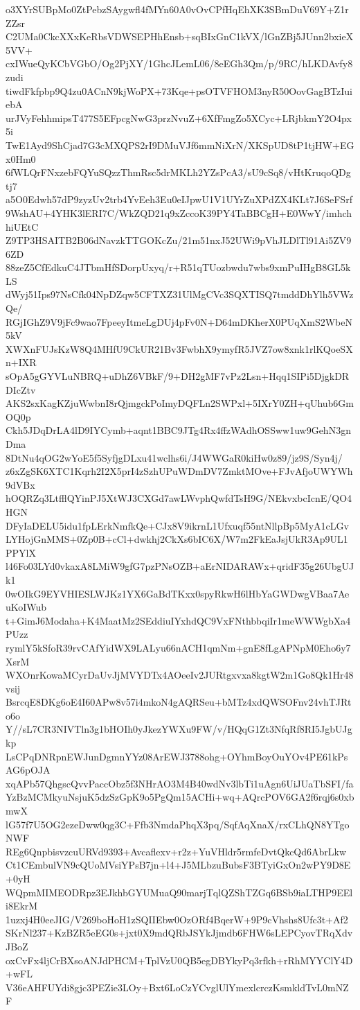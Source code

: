 o3XYrSUBpMo0ZtPebzSAygwfl4fMYn60A0vOvCPfHqEhXK3SBmDuV69Y+Z1rZZsr
C2UMa0CkcXXxKeRbsVDWSEPHhEnsb+sqBIxGnC1kVX/lGnZBj5JUnn2bxieX5VV+
cxIWueQyKCbVGbO/Og2PjXY/1GhcJLemL06/8eEGh3Qm/p/9RC/hLKDAvfy8zudi
tiwdFkfpbp9Q4zu0ACnN9kjWoPX+73Kqe+psOTVFHOM3nyR50OovGagBTzIuiebA
urJVyFehhmipsT477S5EFpcgNwG3przNvuZ+6XfFmgZo5XCyc+LRjbkmY2O4px5i
TwE1Ayd9ShCjad7G3cMXQPS2rI9DMuVJf6mmNiXrN/XKSpUD8tP1tjHW+EGx0Hm0
6fWLQrFNxzebFQYuSQzzThmRsc5drMKLh2YZsPcA3/sU9cSq8/vHtKruqoQDgtj7
a5O0Edwh57dP9zyzUv2trb4YvEeh3Eu0eIJpwU1V1UYrZuXPdZX4KLt7J6SeFSrf
9WshAU+4YHK3lERI7C/WkZQD21q9xZccoK39PY4TaBBCgH+E0WwY/imhchhiUEtC
Z9TP3HSAITB2B06dNavzkTTGOKcZu/21m51nxJ52UWi9pVhJLDlTl91Ai5ZV96ZD
88zeZ5CfEdkuC4JTbmHfSDorpUxyq/r+R51qTUozbwdu7wbs9xmPuIHgB8GL5kLS
dWyj51Ips97NsCfk04NpDZqw5CFTXZ31UlMgCVc3SQXTISQ7tmddDhYlh5VWzQe/
RGjIGhZ9V9jFc9wao7FpeeyItmeLgDUj4pFv0N+D64mDKherX0PUqXmS2WbeN5kV
XWXnFUJsKzW8Q4MHfU9CkUR21Bv3FwbhX9ymyfR5JVZ7ow8xnk1rlKQoeSXn+IXR
sOpA5gGYVLuNBRQ+uDhZ6VBkF/9+DH2gMF7vPz2Lsn+Hqq1SIPi5DjgkDRDIcZtv
AKS2sxKagKZjuWwbnI8rQjmgckPoImyDQFLn2SWPxl+5IXrY0ZH+qUhub6GmOQ0p
Ckh5JDqDrLA4lD9IYCymb+aqnt1BBC9JTg4Rx4ffzWAdhOSSww1uw9GehN3gnDma
8DtNu4qOG2wYoE5f5SyfjgDLxu41wclhs6i/J4WWGaR0kiHw0z89/jz9S/Syn4j/
z6xZgSK6XTC1Kqrh2I2X5prI4zSzhUPuWDmDV7ZmktMOve+FJvAfjoUWYWh9dVBx
hOQRZq3LtfflQYinPJ5XtWJ3CXGd7awLWvphQwfdTsH9G/NEkvxbcIcnE/QO4HGN
DFyIaDELU5idu1fpLErkNmfkQe+CJx8V9ikrnL1Ufxuqf55ntNllpBp5MyA1cLGv
LYHojGnMMS+0Zp0B+cCl+dwkhj2CkXs6bIC6X/W7m2FkEaJsjUkR3Ap9UL1PPYlX
l46Fo03LYd0vkaxA8LMiW9gfG7pzPNsOZB+aErNIDARAWx+qridF35g26UbgUJk1
0wOIkG9EYVHIESLWJKz1YX6GaBdTKxx0spyRkwH6lHbYaGWDwgVBaa7AeuKoIWub
t+GimJ6Modaha+K4MaatMz2SEddiuIYxhdQC9VxFNthbbqiIr1meWWWgbXa4PUzz
rymlY5kSfoR39rvCAfYidWX9LALyu66nACH1qmNm+gnE8fLgAPNpM0Eho6y7XsrM
WXOnrKowaMCyrDaUvJjMVYDTx4AOeeIv2JURtgxvxa8kgtW2m1Go8Qk1Hr48vsij
BsrcqE8DKg6oE4I60APw8v57i4mkoN4gAQRSeu+bMTz4xdQWSOFnv24vhTJRto6o
Y//sL7CR3NIVTln3g1bHOIh0yJkezYWXu9FW/v/HQqG1Zt3NfqRf8RI5JgbUJgkp
LsCPqDNRpnEWJunDgmnYYz08ArEWJ3788ohg+OYhmBoyOuYOv4PE61kPsAG6pOJA
xqAPb57QhgscQvvPaccObz5f3NHrAO3M4B40wdNv3lbTi1uAgn6UiJUaTbSFI/fa
YzBzMCMkyuNsjuK5dzSzGpK9o5PgQm15ACHi+wq+AQrcPOV6GA2f6rqj6s0xbmwX
lG57f7U5OG2ezeDww0qg3C+Ffb3NmdaPhqX3pq/SqfAqXnaX/rxCLhQN8YTgoNWF
REg6QnpbisvzcuURVd9393+Avcaflexv+r2z+YuVHldr5rmfeDvtQkcQd6AbrLkw
Ct1CEmbulVN9cQUoMVsiYPsB7jn+l4+J5MLbzuBubsF3BTyiGxOn2wPY9D8E+0yH
WQpmMIMEODRpz3EJkhbGYUMuaQ90marjTqlQZShTZGq6BSb9iaLTHP9EEli8EkrM
1uzxj4H0eeJIG/V269boHoH1zSQIIEbw0OzORf4BqerW+9P9cVhshs8Ufc3t+Af2
SKrNl237+KzBZR5eEG0s+jxt0X9mdQRbJSYkJjmdb6FHW6sLEPCyovTRqXdvJBoZ
oxCvFx4ljCrBXsoANJdPHCM+TplVzU0QB5egDBYkyPq3rfkh+rRhMYYClY4D+wFL
V36eAHFUYdi8gjc3PEZie3LOy+Bxt6LoCzYCvglUlYmexlcrczKsmkldTvL0mNZF
